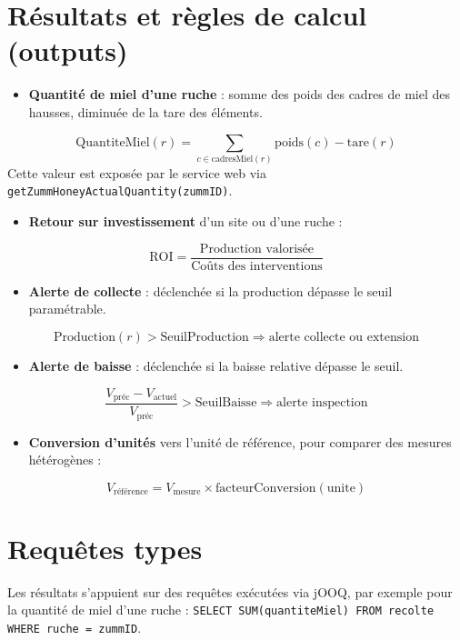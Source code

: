 \section{Résultats et règles de calcul (outputs)}
\begin{itemize}
  \item \textbf{Quantité de miel d'une ruche} : somme des poids des cadres de miel des hausses, diminuée de la tare des éléments.
\end{itemize}
\[ \text{QuantiteMiel}(r) = \sum_{c \in \text{cadresMiel}(r)} \text{poids}(c) - \text{tare}(r) \]
Cette valeur est exposée par le service web via \texttt{getZummHoneyActualQuantity(zummID)}.
\begin{itemize}
  \item \textbf{Retour sur investissement} d'un site ou d'une ruche :
\end{itemize}
\[ \text{ROI} = \frac{\text{Production valorisée}}{\text{Coûts des interventions}} \]
\begin{itemize}
  \item \textbf{Alerte de collecte} : déclenchée si la production dépasse le seuil paramétrable.
\end{itemize}
\[ \text{Production}(r) > \text{SeuilProduction} \Rightarrow \text{alerte collecte ou extension} \]
\begin{itemize}
  \item \textbf{Alerte de baisse} : déclenchée si la baisse relative dépasse le seuil.
\end{itemize}
\[ \frac{V_{\text{préc}} - V_{\text{actuel}}}{V_{\text{préc}}} > \text{SeuilBaisse} \Rightarrow \text{alerte inspection} \]
\begin{itemize}
  \item \textbf{Conversion d'unités} vers l'unité de référence, pour comparer des mesures hétérogènes :
\end{itemize}
\[ V_{\text{référence}} = V_{\text{mesure}} \times \text{facteurConversion}(\text{unite}) \]

\section{Requêtes types}
Les résultats s'appuient sur des requêtes exécutées via jOOQ, par exemple pour la
quantité de miel d'une ruche : \texttt{SELECT SUM(quantiteMiel) FROM recolte WHERE ruche = zummID}.

